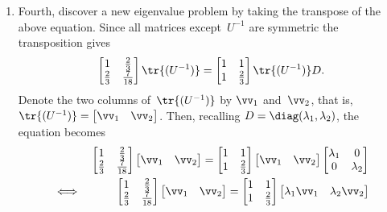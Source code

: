 \begin{example}
\begin{solution}
\begin{enumerate}
\item \label{eg:2expfitd}
Fourth, discover a new eigenvalue problem by taking the transpose of the above equation. 
Since all matrices except~\(U^{-1}\) are symmetric the transposition gives
\begin{equation*}
\begin{bmatrix} 1&\tfrac23\\\tfrac23&\frac7{18} \end{bmatrix}\tr{(U^{-1})}
=\begin{bmatrix} 1&1\\1&\tfrac23 \end{bmatrix}\tr{(U^{-1})}D.
\end{equation*}
Denote the two columns of~\(\tr{(U^{-1})}\) by \(\vv_1\) and~\(\vv_2\), that is, \(\tr{(U^{-1})}=\begin{bmatrix} \vv_1&\vv_2 \end{bmatrix}\).
Then, recalling \(D=\diag(\lambda_1,\lambda_2)\), the equation becomes
\begin{eqnarray*}
&&\begin{bmatrix} 1&\tfrac23\\\tfrac23&\frac7{18} \end{bmatrix}\begin{bmatrix} \vv_1&\vv_2 \end{bmatrix}
=\begin{bmatrix} 1&1\\1&\tfrac23 \end{bmatrix}\begin{bmatrix} \vv_1&\vv_2 \end{bmatrix}
\begin{bmatrix} \lambda_1&0\\0&\lambda_2 \end{bmatrix}
\\\iff&&
\begin{bmatrix} 1&\tfrac23\\\tfrac23&\frac7{18} \end{bmatrix}\begin{bmatrix} \vv_1&\vv_2 \end{bmatrix}
=\begin{bmatrix} 1&1\\1&\tfrac23 \end{bmatrix}\begin{bmatrix} \lambda_1\vv_1&\lambda_2\vv_2 \end{bmatrix}

\end{eqnarray*}
\end{enumerate}
\end{solution}
\end{example}
